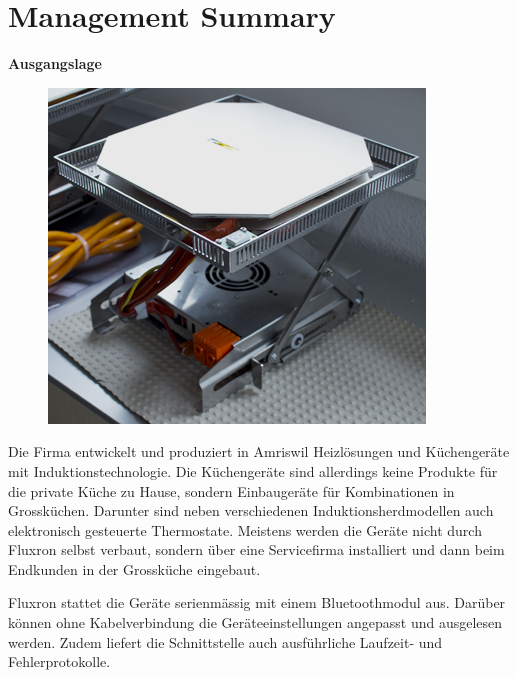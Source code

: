 \chapter*{Management Summary}

\textbf{Ausgangslage}

\begin{figure}
	\vspace{-0.5cm}
	\begin{center}
		\includegraphics[scale=1]{start/img/img_7680}
	\end{center}
	\vspace{-0.5cm}
\end{figure}

Die Firma \fluxron{} entwickelt und produziert in Amriswil Heizlösungen und Küchengeräte mit Induktionstechnologie. Die Küchengeräte sind allerdings keine Produkte für die private Küche zu Hause, sondern Einbaugeräte für Kombinationen in Grossküchen. Darunter sind neben verschiedenen Induktionsherdmodellen auch elektronisch gesteuerte Thermostate. Meistens werden die Geräte nicht durch Fluxron selbst verbaut, sondern über eine Servicefirma installiert und dann beim Endkunden in der Grossküche eingebaut.

Fluxron stattet die Geräte serienmässig mit einem Bluetoothmodul aus. Darüber können ohne Kabelverbindung die Geräteeinstellungen angepasst und ausgelesen werden. Zudem liefert die Schnittstelle auch ausführliche Laufzeit- und Fehlerprotokolle.


